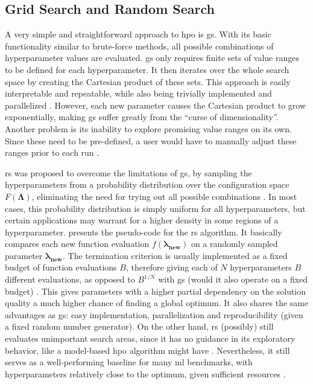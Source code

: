 \subsection{Grid Search and Random Search}

A very simple and straightforward approach to \gls{hpo} is \gls{gs}. With its basic functionality similar to brute-force methods, all possible combinations of hyperparameter values are evaluated. \gls{gs} only requires finite sets of value ranges to be defined for each hyperparameter. It then iterates over the whole search space by creating the Cartesian product of these sets. This approach is easily interpretable and repeatable, while also being trivially implemented and parallelized \cite{bergstra2012random}. However, each new parameter causes the Cartesian product to grow exponentially, making \gls{gs} suffer greatly from the \enquote{curse of dimensionality}. Another problem is its inability to explore promising value ranges on its own. Since these need to be pre-defined, a user would have to manually adjust these ranges prior to each run \cite{yang2020hyperparameter}.

\gls{rs} was proposed to overcome the limitations of \gls{gs}, by sampling the hyperparameters from a probability distribution over the configuration space $F(\mathbf{\Lambda})$, eliminating the need for trying out all possible combinations \cite{bergstra2012random}. In most cases, this probability distribution is simply uniform for all hyperparameters, but certain applications may warrant for a higher density in some regions of a hyperparameter.  presents the pseudo-code for the \gls{rs} algorithm. It basically compares each new function evaluation $f(\mathbf{\lambda_{\text{new}}})$ on a randomly sampled parameter $\mathbf{\lambda_{\text{new}}}$. The termination criterion is usually implemented as a fixed budget of function evaluations $B$, therefore giving each of $N$ hyperparameters $B$ different evaluations, as opposed to $B^{1/N}$ with \gls{gs} (would it also operate on a fixed budget) \cite{bergstra2012random}. This gives parameters with a higher partial dependency on the solution quality a much higher chance of finding a global optimum. It also shares the same advantages as \gls{gs}: easy implementation, parallelization and reproducibility (given a fixed random number generator). On the other hand, \gls{rs} (possibly) still evaluates unimportant search areas, since it has no guidance in its exploratory behavior, like a model-based \gls{hpo} algorithm might have \cite{yang2020hyperparameter}.
Nevertheless, it still serves as a well-performing baseline for many \gls{ml} benchmarks, with hyperparameters relatively close to the optimum, given sufficient resources \cite{feurer2019hyperparameter}.

